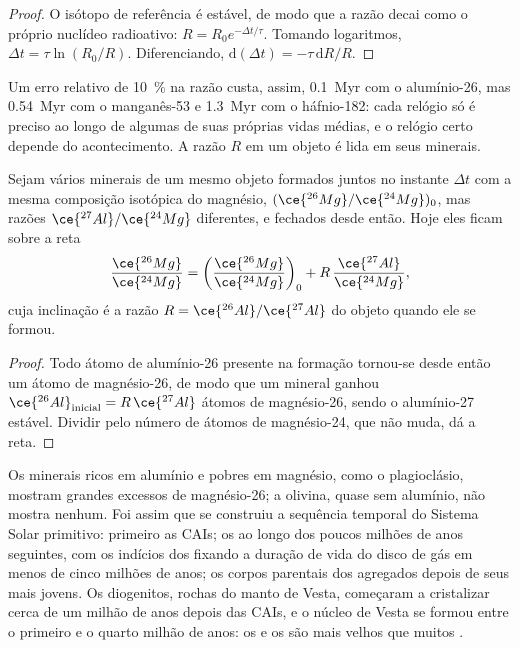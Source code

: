 \begin{proof}
O isótopo de referência é estável, de modo que a razão decai como o próprio nuclídeo
radioativo: $R = R_0 e^{-\Delta t/\tau}$. Tomando logaritmos,
$\Delta t = \tau\ln(R_0/R)$. Diferenciando, $\mathrm d(\Delta t) =
-\tau\,\mathrm dR/R$.
\end{proof}

Um erro relativo de \qty{10}{\percent} na razão custa, assim,
\qty{0.1}{Myr} com o alumínio-26, mas \qty{0.54}{Myr} com o manganês-53 e
\qty{1.3}{Myr} com o háfnio-182: cada relógio só é preciso ao longo de algumas de suas
próprias vidas médias, e o relógio certo depende do acontecimento. A razão $R$ em um
objeto é lida em seus minerais.

\begin{proposition}
\label{prop:b2:planet-formation-meteorites:al-mg}
Sejam vários minerais de um mesmo objeto formados juntos no instante $\Delta t$ com a
mesma composição isotópica do magnésio, $(\ce{^{26}Mg}/\ce{^{24}Mg})_0$, mas
razões $\ce{^{27}Al}/\ce{^{24}Mg}$ diferentes, e fechados desde então. Hoje eles
ficam sobre a reta
\[
  \frac{\ce{^{26}Mg}}{\ce{^{24}Mg}}
  = \left(\frac{\ce{^{26}Mg}}{\ce{^{24}Mg}}\right)_0
  + R\,\frac{\ce{^{27}Al}}{\ce{^{24}Mg}},
\]
cuja inclinação é a razão $R = \ce{^{26}Al}/\ce{^{27}Al}$ do objeto quando ele
se formou.
\end{proposition}

\begin{proof}
Todo átomo de alumínio-26 presente na formação tornou-se desde então um
átomo de magnésio-26, de modo que um mineral ganhou
$\ce{^{26}Al}_{\text{inicial}} = R\,\ce{^{27}Al}$ átomos de magnésio-26, sendo o alumínio-27
estável. Dividir pelo número de átomos de magnésio-24, que não muda,
dá a reta.
\end{proof}

Os minerais ricos em alumínio e pobres em magnésio, como o plagioclásio, mostram grandes excessos
de magnésio-26; a olivina, quase sem alumínio, não mostra nenhum. Foi assim que se
construiu a sequência temporal do Sistema Solar primitivo: primeiro as CAIs; os  ao longo
dos poucos milhões de anos seguintes, com os indícios dos  fixando a
duração de vida do disco de gás em menos de cinco milhões de anos; os corpos parentais
dos  agregados depois de seus  mais jovens. Os diogenitos,
rochas do manto de Vesta, começaram a cristalizar cerca de um milhão de anos depois
das CAIs, e o núcleo de Vesta se formou entre o primeiro e o
quarto milhão de anos: os  e os  são mais velhos que muitos
.

